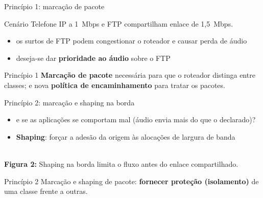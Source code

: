\documentclass[aspectratio=169,11pt]{beamer}
\begin{document}
\begin{frame}{Princípio 1: marcação de pacote}
  \begin{exampleblock}{Cenário}
    Telefone IP a 1~Mbps e FTP compartilham enlace de 1,5~Mbps.
    \begin{itemize}
      \item os surtos de FTP podem congestionar o roteador e causar perda de áudio
      \item deseja-se dar \textbf{prioridade ao áudio} sobre o FTP
    \end{itemize}
  \end{exampleblock}
  \begin{block}{Princípio 1}
    \textbf{Marcação de pacote} necessária para que o roteador distinga entre classes; e nova \textbf{política de encaminhamento} para tratar os pacotes.
  \end{block}
\end{frame}

\begin{frame}{Princípio 2: marcação e shaping na borda}
  \begin{itemize}
    \item e se as aplicações se comportam mal (áudio envia mais do que o declarado)?
    \item \textbf{Shaping}: forçar a adesão da origem às alocações de largura de banda
  \end{itemize}
  \begin{center}
    \\[1mm]
    {\scriptsize \textbf{Figura 2:} Shaping na borda limita o fluxo antes do enlace compartilhado.}
  \end{center}
  \begin{block}{Princípio 2}
    Marcação e shaping de pacote: \textbf{fornecer proteção (isolamento)} de uma classe frente a outras.
  \end{block}
\end{frame}
\end{document}

